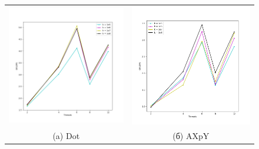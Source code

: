 \documentclass[12pt, a4paper]{article}
\begin{document}
\begin{figure}[H]
	\center
	\begin{tabular}{cc}
		\includegraphics[width=85mm]{multithread_pc_dot} & \includegraphics[width=85mm]{multithread_pc_axpy} \\
		(a) Dot & (б) AXpY \\

\end{tabular}
\end{figure}
\end{document}
